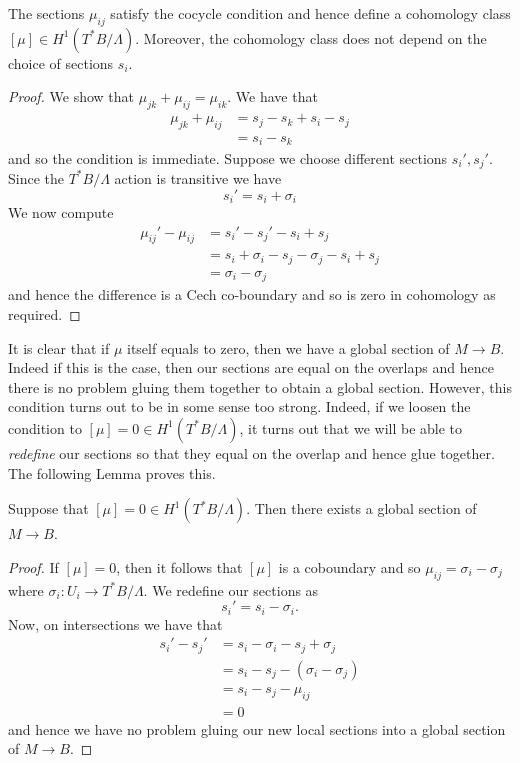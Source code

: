 \begin{prop}\label{lemma:cocycle-chern}
    The sections $\mu_{ij}$ satisfy the cocycle condition and hence define a cohomology class
    $[\mu] \in H^1(T^*B/\Lambda)$. Moreover, the cohomology class does not depend on the choice of sections $s_i$.
\end{prop}
\begin{proof}
    We show that $\mu_{jk}+\mu_{ij} = \mu_{ik} $. We have that
    \begin{align*}
        \mu_{jk} + \mu_{ij} & =s_j-s_k + s_i-s_j \\
                            & = s_i -s_k
    \end{align*}
    and so the condition is immediate. Suppose we choose different sections $s_i',s_j'$. Since the $T^*B/\Lambda$ action is
    transitive we have
    $$s_i' = s_i + \sigma_i$$
    We now compute
    \begin{align*}
        \mu_{ij}' - \mu_{ij} & = s_i' - s_j' -s_i +s_j                      \\
                             & = s_i+ \sigma_i - s_j - \sigma_j - s_i + s_j \\
                             & = \sigma_i - \sigma_j
    \end{align*}
    and hence the difference is a Cech co-boundary and so is zero in cohomology as required.
\end{proof}

It is clear that if $\mu$ itself equals to zero, then we have a global section
of $M \to B$. Indeed if this is the case, then our sections are equal on the
overlaps and hence there is no problem gluing them together to obtain a global
section. However, this condition turns out to be in some sense too strong.
Indeed, if we loosen the condition to $[\mu] = 0 \in H^1(T^*B/\Lambda)$, it
turns out that we will be able to \emph{redefine} our sections so that they
equal on the overlap and hence glue together. The following Lemma proves this.

\begin{lemma}
    Suppose that $[\mu]=0 \in H^1(T^*B/\Lambda)$. Then there exists a global section of $M \to B$.
\end{lemma}

\begin{proof}
    If $[\mu]=0$, then it follows that $[\mu]$ is a coboundary and so $\mu_{ij} = \sigma_i - \sigma_j$ where $\sigma_i : U_i \to T^*B/\Lambda$.
    We redefine our sections as
    $$
        s_i' = s_i - \sigma_i.
    $$
    Now, on intersections we have that
    \begin{align*}
        s_i' - s_j' & =  s_i - \sigma_i - s_j + \sigma_j    \\
                    & = s_i -  s_j - ( \sigma_i - \sigma_j) \\
                    & = s_i -  s_j - \mu_{ij}               \\
                    & = 0
    \end{align*}
    and hence we have no problem gluing our new local sections into a global section of $M \to B$.
\end{proof}

